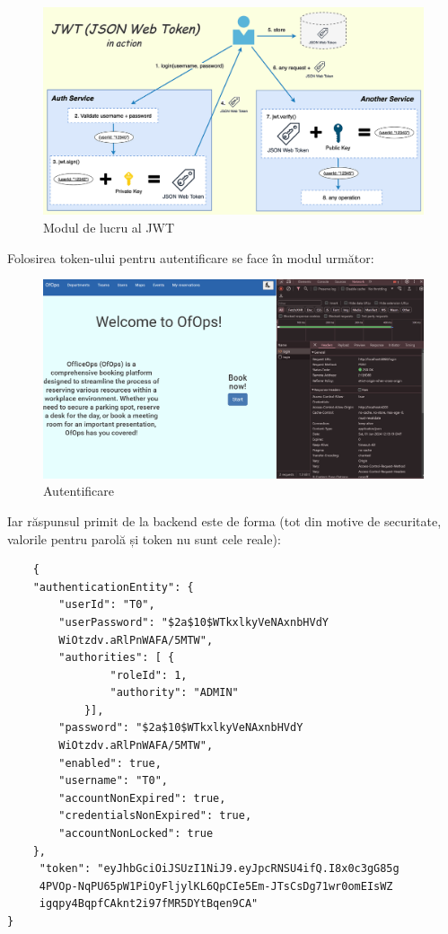 \begin{figure}[!htb]
    \centering
    \includegraphics[width=0.9\linewidth]{images/jwt.png}
    \caption{Modul de lucru al JWT}
    \label{fig:jwt}
\end{figure}

\newpage
Folosirea token-ului pentru autentificare se face în modul următor:

\begin{figure}[!htb]
    \centering
    \includegraphics[width=0.9\linewidth]{images/autentificare.png}
    \caption{Autentificare}
    \label{fig:autentificare}
\end{figure}

Iar răspunsul primit de la backend este de forma (tot din motive de securitate, valorile pentru parolă și token nu sunt cele reale):

\begin{center}
\begin{minipage}{0.8\textwidth}
\captionsetup{type=listing}
   \begin{lstlisting}
    {
    "authenticationEntity": {
        "userId": "T0",
        "userPassword": "$2a$10$WTkxlkyVeNAxnbHVdY
        WiOtzdv.aRlPnWAFA/5MTW",
        "authorities": [ {
                "roleId": 1,
                "authority": "ADMIN"
            }],
        "password": "$2a$10$WTkxlkyVeNAxnbHVdY
        WiOtzdv.aRlPnWAFA/5MTW",
        "enabled": true,
        "username": "T0",
        "accountNonExpired": true,
        "credentialsNonExpired": true,
        "accountNonLocked": true
    },
     "token": "eyJhbGciOiJSUzI1NiJ9.eyJpcRNSU4ifQ.I8x0c3gG85g
     4PVOp-NqPU65pW1PiOyFljylKL6QpCIe5Em-JTsCsDg71wr0omEIsWZ
     igqpy4BqpfCAknt2i97fMR5DYtBqen9CA"
}
\end{lstlisting} 
\end{minipage}
\end{center}

